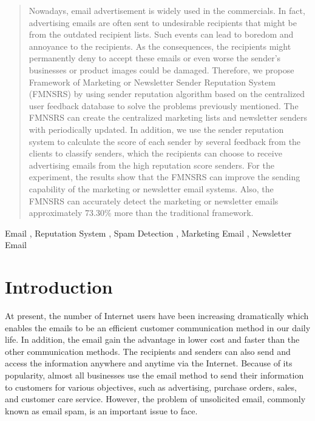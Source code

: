 \documentclass[conference]{IEEEtran}
\begin{document}
\maketitle


\begin{abstract}
%
Nowadays, email advertisement is widely used in the commercials. 
%
In fact, advertising emails are often sent to undesirable recipients that might be from the outdated recipient lists. 
%
Such events can lead to boredom and annoyance to the recipients. 
%
As the consequences, the recipients might permanently deny to accept these emails or even worse the sender's businesses or product images could be damaged.
% 
Therefore, we propose Framework of Marketing or Newsletter Sender Reputation System (FMNSRS) by using sender reputation algorithm based on the centralized user feedback database to solve the problems previously mentioned. 
%
The FMNSRS can create the centralized marketing lists and newsletter senders with periodically updated. 
%
In addition, we use the sender reputation system to calculate the score of each sender by several feedback from the clients to classify senders, which the recipients can choose to receive advertising emails from the high reputation score senders. 
% 
For the experiment, the results show that the FMNSRS can improve the sending capability of the marketing or newsletter email systems.
% 
Also, the FMNSRS can accurately detect the marketing or newsletter emails approximately 73.30\% more than the traditional framework.
\end{abstract}

\begin{IEEEkeywords}
Email , Reputation System , Spam Detection , Marketing Email , Newsletter Email
\end{IEEEkeywords}

\IEEEpeerreviewmaketitle



\section{Introduction}

At present, the number of Internet users have been increasing dramatically which enables the emails to be an efficient customer communication method in our daily life.
%
In addition, the email gain the advantage in lower cost and faster than the other communication methods. 
%
The recipients and senders can also send and access the information anywhere and anytime via the Internet.
%
Because of its popularity, almost all businesses use the email method to send their information to customers for various objectives, such as advertising, purchase orders, sales, and customer care service.
%
However, the problem of unsolicited email, commonly known as email spam, is an important issue to face.
\end{document}

